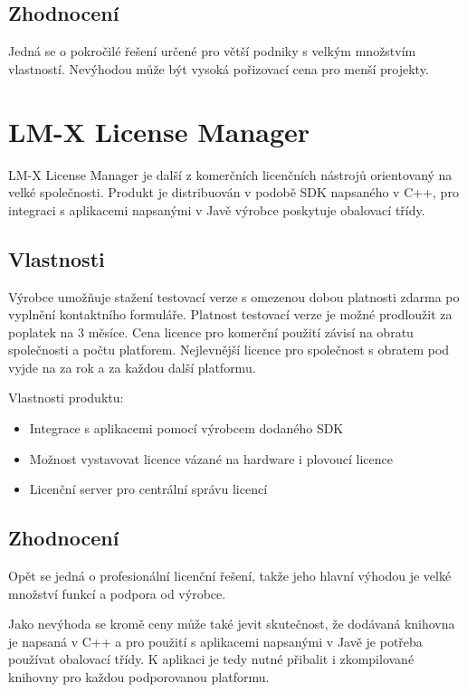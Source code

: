 \subsection*{Zhodnocení}
Jedná se o pokročilé řešení určené pro větší podniky s velkým množstvím
vlastností. Nevýhodou může být vysoká pořizovací cena pro menší projekty.

\section{LM-X License Manager}
LM-X License Manager\cite{lm-x} je další z komerčních licenčních nástrojů
orientovaný na velké společnosti. Produkt je distribuován v podobě SDK napsaného
v C++, pro integraci s aplikacemi napsanými v Javě výrobce poskytuje obalovací
třídy.

\subsection*{Vlastnosti}
Výrobce umožňuje stažení testovací verze s omezenou dobou platnosti zdarma po
vyplnění kontaktního formuláře. Platnost testovací verze je možné prodloužit za
poplatek  na 3 měsíce. Cena licence pro komerční použití závisí na
obratu společnosti a počtu platforem. Nejlevnější licence pro společnost s
obratem pod  vyjde na  za rok a  za každou další
platformu.

Vlastnosti produktu:

\begin{itemize}
  \item Integrace s aplikacemi pomocí výrobcem dodaného SDK
  \item Možnost vystavovat licence vázané na hardware i plovoucí licence
  \item Licenční server pro centrální správu licencí 
\end{itemize}

\subsection*{Zhodnocení}
Opět se jedná o profesionální licenční řešení, takže jeho hlavní výhodou je
velké množství funkcí a podpora od výrobce.

Jako nevýhoda se kromě ceny může také jevit skutečnost, že dodávaná knihovna je
napsaná v C++ a pro použití s aplikacemi napsanými v Javě je potřeba používat
obalovací třídy. K aplikaci je tedy nutné přibalit i zkompilované knihovny pro
každou podporovanou platformu.

